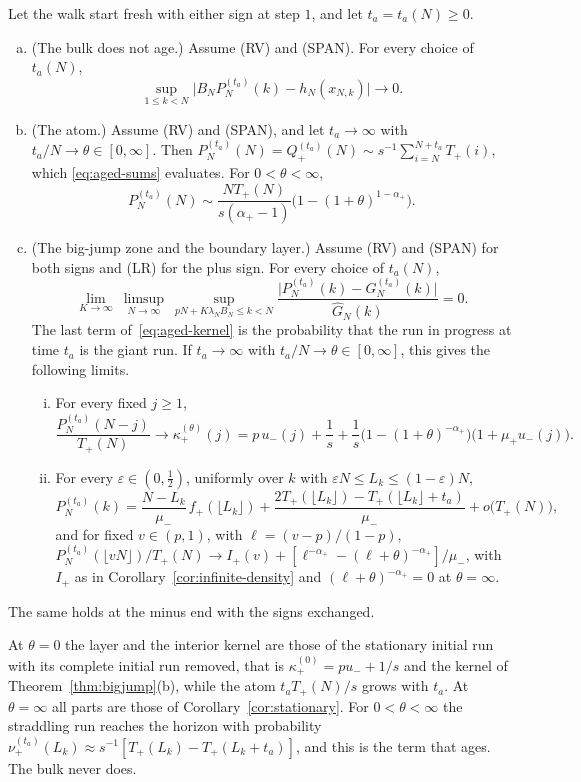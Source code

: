 \begin{introtheorem}[aging]\label{thm:aging}
Let the walk start fresh with either sign at step $1$, and let $t_a=t_a(N)\ge0$.
\begin{enumerate}[(a)]
\item (The bulk does not age.) Assume (RV) and (SPAN). For every choice of $t_a(N)$,
\[
 \sup_{1\le k<N}\bigl|B_NP^{(t_a)}_N(k)-h_N(x_{N,k})\bigr|\to0 .
\]
\item (The atom.) Assume (RV) and (SPAN), and let $t_a\to\infty$ with $t_a/N\to\theta\in[0,\infty]$.
Then $P^{(t_a)}_N(N)=Q^{(t_a)}_\plus(N)\sim s^{-1}\sum_{i=N}^{N+t_a}T_\plus(i)$, which
\eqref{eq:aged-sums} evaluates. For $0<\theta<\infty$,
\[
 P^{(t_a)}_N(N)\sim\frac{NT_\plus(N)}{s(\alpha_\plus-1)}\bigl(1-(1+\theta)^{1-\alpha_\plus}\bigr).
\]
\item (The big-jump zone and the boundary layer.) Assume (RV) and (SPAN) for both signs and
(LR) for the plus sign. For every choice of $t_a(N)$,
\[
 \lim_{K\to\infty}\ \limsup_{N\to\infty}\ \sup_{pN+K\lambda_NB_N\le k<N}
 \frac{\bigl|P^{(t_a)}_N(k)-G^{(t_a)}_N(k)\bigr|}{\widehat G_N(k)}=0 .
\]
The last term of~\eqref{eq:aged-kernel} is the probability that the run in progress at time
$t_a$ is the giant run.
If $t_a\to\infty$ with $t_a/N\to\theta\in[0,\infty]$, this gives the following limits.
\begin{enumerate}[(i)]
\item For every fixed $j\ge1$,
\[
 \frac{P^{(t_a)}_N(N-j)}{T_\plus(N)}\to\kappa^{(\theta)}_\plus(j)
 =p\,u_\minus(j)+\frac1s+\frac1s\bigl(1-(1+\theta)^{-\alpha_\plus}\bigr)\bigl(1+\mu_\plus u_\minus(j)\bigr).
\]
\item For every $\varepsilon\in(0,\frac12)$, uniformly over $k$ with $\varepsilon N\le L_k\le(1-\varepsilon)N$,
\[
 P^{(t_a)}_N(k)=\frac{N-L_k}{\mu_\minus}\,f_\plus(\lfloor L_k\rfloor)
 +\frac{2T_\plus(\lfloor L_k\rfloor)-T_\plus(\lfloor L_k\rfloor+t_a)}{\mu_\minus}+o\bigl(T_\plus(N)\bigr),
\]
and for fixed $v\in(p,1)$, with $\ell=(v-p)/(1-p)$,
$P^{(t_a)}_N(\lfloor vN\rfloor)/T_\plus(N)\to I_\plus(v)+[\ell^{-\alpha_\plus}-(\ell+\theta)^{-\alpha_\plus}]/\mu_\minus$,
with $I_\plus$ as in Corollary~\ref{cor:infinite-density} and $(\ell+\theta)^{-\alpha_\plus}=0$ at $\theta=\infty$.
\end{enumerate}
\end{enumerate}
The same holds at the minus end with the signs exchanged.
\end{introtheorem}

At $\theta=0$ the layer and the interior kernel are those of the stationary initial run
with its complete initial run removed, that is $\kappa^{(0)}_\plus=pu_\minus+1/s$ and the
kernel of Theorem~\ref{thm:bigjump}(b), while the atom $t_aT_\plus(N)/s$ grows with $t_a$.
At $\theta=\infty$ all parts are those of Corollary~\ref{cor:stationary}. For
$0<\theta<\infty$ the straddling run reaches the horizon with probability
$\nu^{(t_a)}_\plus(L_k)\approx s^{-1}[T_\plus(L_k)-T_\plus(L_k+t_a)]$, and this is the term that
ages. The bulk never does.


